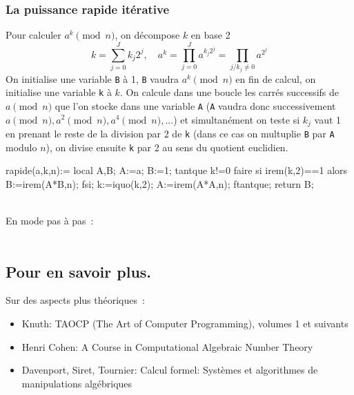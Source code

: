 \documentclass[a4paper,11pt]{article}
\begin{document}
\begin{giacjshere}
\subsubsection{La puissance rapide it\'erative}
Pour calculer $a^k \pmod n$, on d\'ecompose $k$ en base 2
$$ k=\sum_{j=0}^J k_j 2^j, \quad a^k = \prod_{j=0}^{J} a^{k_j 2^j} 
= \prod_{j/k_j \neq 0} a^{2^j} $$
On initialise une variable \verb|B| \`a 1, \verb|B| vaudra $a^k \pmod
n$ en fin de calcul, on initialise une variable \verb|k| \`a $k$.
On calcule dans une boucle les carr\'es successifs de $a
\pmod n$ que l'on stocke dans une variable \verb|A| (\verb|A| 
vaudra donc successivement $a \pmod n, a^2 \pmod n, a^{4} \pmod n,
...$) et simultan\'ement on teste si $k_j$ vaut 1 en prenant le reste de la
division par 2 de \verb|k| (dans ce cas on multuplie \verb|B| par
\verb|A| modulo $n$), on divise ensuite \verb|k| par 2  au sens du quotient
euclidien.
\begin{giacprog}
rapide(a,k,n):={
  local A,B;
  A:=a; B:=1;
  tantque k!=0 faire
    si irem(k,2)==1 alors B:=irem(A*B,n); fsi;
    k:=iquo(k,2);
    A:=irem(A*A,n);
  ftantque;
  return B;
}
\end{giacprog}
\\
En mode pas \`a pas~:\\
\\

\subsection{Pour en savoir plus.}
Sur des aspects plus th\'eoriques~:
\begin{itemize}
\item Knuth: TAOCP (The Art of Computer Programming), volumes 1 et suivants
\item Henri Cohen: A Course in Computational Algebraic Number Theory
\item Davenport, Siret, Tournier: Calcul formel: Syst\`emes et algorithmes 
de manipulations  alg\'ebriques
\end{itemize}


\end{giacjshere}
\end{document}
